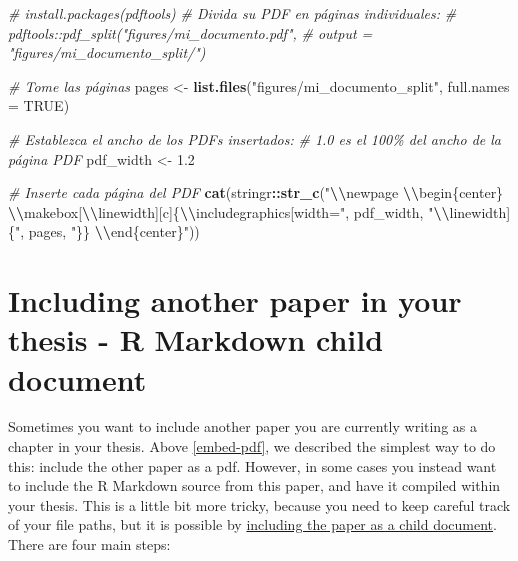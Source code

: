 \documentclass[a4paper, nobind]{templates/ociamthesis}
\newenvironment{Shaded}{\begin{snugshade}}{\end{snugshade}}
\newcommand{\AttributeTok}[1]{\textcolor[rgb]{0.13,0.29,0.53}{#1}}
\newcommand{\CommentTok}[1]{\textcolor[rgb]{0.56,0.35,0.01}{\textit{#1}}}
\newcommand{\ConstantTok}[1]{\textcolor[rgb]{0.56,0.35,0.01}{#1}}
\newcommand{\FloatTok}[1]{\textcolor[rgb]{0.00,0.00,0.81}{#1}}
\newcommand{\FunctionTok}[1]{\textcolor[rgb]{0.13,0.29,0.53}{\textbf{#1}}}
\newcommand{\NormalTok}[1]{#1}
\newcommand{\OtherTok}[1]{\textcolor[rgb]{0.56,0.35,0.01}{#1}}
\newcommand{\SpecialCharTok}[1]{\textcolor[rgb]{0.81,0.36,0.00}{\textbf{#1}}}
\newcommand{\StringTok}[1]{\textcolor[rgb]{0.31,0.60,0.02}{#1}}
\renewenvironment{Shaded}
{
  \vspace{10pt}%
  \begin{snugshade}%
}{%
  \end{snugshade}%
  \vspace{8pt}%
}
\begin{document}
\begin{Shaded}
\begin{Highlighting}[]
\CommentTok{\# install.packages(pdftools)}
\CommentTok{\# Divida su PDF en páginas individuales:}
\CommentTok{\# pdftools::pdf\_split("figures/mi\_documento.pdf",}
\CommentTok{\# output = "figures/mi\_documento\_split/")}

\CommentTok{\# Tome las páginas}
\NormalTok{pages }\OtherTok{\textless{}{-}} \FunctionTok{list.files}\NormalTok{(}\StringTok{"figures/mi\_documento\_split"}\NormalTok{, }\AttributeTok{full.names =} \ConstantTok{TRUE}\NormalTok{)}

\CommentTok{\# Establezca el ancho de los PDFs insertados:}
\CommentTok{\# 1.0 es el 100\% del ancho de la página PDF}
\NormalTok{pdf\_width }\OtherTok{\textless{}{-}} \FloatTok{1.2}

\CommentTok{\# Inserte cada página del PDF}
\FunctionTok{cat}\NormalTok{(stringr}\SpecialCharTok{::}\FunctionTok{str\_c}\NormalTok{(}\StringTok{"}\SpecialCharTok{\textbackslash{}\textbackslash{}}\StringTok{newpage }\SpecialCharTok{\textbackslash{}\textbackslash{}}\StringTok{begin\{center\}}
\StringTok{    }\SpecialCharTok{\textbackslash{}\textbackslash{}}\StringTok{makebox[}\SpecialCharTok{\textbackslash{}\textbackslash{}}\StringTok{linewidth][c]\{}\SpecialCharTok{\textbackslash{}\textbackslash{}}\StringTok{includegraphics[width="}\NormalTok{, pdf\_width,}
    \StringTok{"}\SpecialCharTok{\textbackslash{}\textbackslash{}}\StringTok{linewidth]\{"}\NormalTok{, pages, }\StringTok{"\}\} }\SpecialCharTok{\textbackslash{}\textbackslash{}}\StringTok{end\{center\}"}\NormalTok{))}
\end{Highlighting}
\end{Shaded}

\section{Including another paper in your thesis - R Markdown child document}\label{embed-rmd}

Sometimes you want to include another paper you are currently writing as a chapter in your thesis.
Above \ref{embed-pdf}, we described the simplest way to do this: include the other paper as a pdf.
However, in some cases you instead want to include the R Markdown source from this paper, and have it compiled within your thesis.
This is a little bit more tricky, because you need to keep careful track of your file paths, but it is possible by \href{https://bookdown.org/yihui/rmarkdown-cookbook/child-document.html}{including the paper as a child document}.
There are four main steps:
\end{document}
